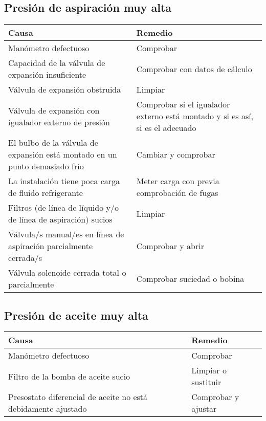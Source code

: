 \subsection{Presi\'on de aspiraci\'on muy alta}

\begin{table}[H]
    \begin{center}
        \begin{tabular}{p{8cm} p{7cm}}
            \textbf{Causa} & \textbf{Remedio}\\ \hline
            Man\'ometro defectuoso & Comprobar\\
            Capacidad de la v\'alvula de expansi\'on insuficiente & Comprobar con datos de c\'alculo\\
            V\'alvula de expansi\'on obstruida & Limpiar\\
            V\'alvula de expansi\'on con igualador externo de presi\'on & Comprobar si el igualador externo est\'a montado y si es as\'i, si es el adecuado\\
            El bulbo de la v\'alvula de expansi\'on est\'a montado en un punto demasiado fr\'io & Cambiar y comprobar\\
            La instalaci\'on tiene poca carga de fluido refrigerante & Meter carga con previa comprobaci\'on de fugas\\
            Filtros (de l\'inea de l\'iquido y/o de l\'inea de aspiraci\'on) sucios & Limpiar\\
            V\'alvula/s manual/es en l\'inea de aspiraci\'on parcialmente cerrada/s & Comprobar y abrir\\
            V\'alvula solenoide cerrada total o parcialmente & Comprobar suciedad o bobina\\ \hline
        \end{tabular}
    \end{center}
\end{table}

\subsection{Presi\'on de aceite muy alta}

\begin{table}[H]
    \begin{center}
        \begin{tabular}{p{8cm} p{7cm}}
            \textbf{Causa} & \textbf{Remedio}\\ \hline
            Man\'ometro defectuoso & Comprobar\\
            Filtro de la bomba de aceite sucio & Limpiar o sustituir\\
            Presostato diferencial de aceite no est\'a debidamente ajustado & Comprobar y ajustar\\ \hline
        \end{tabular}
    \end{center}
\end{table}

